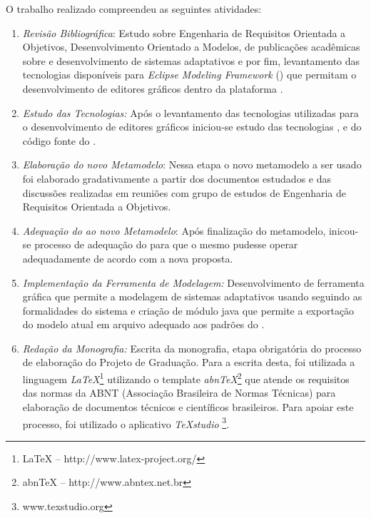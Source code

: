 O trabalho realizado compreendeu as seguintes atividades:


\begin{enumerate}
	
	\item \textit{Revisão Bibliográfica}: Estudo sobre Engenharia de Requisitos Orientada a Objetivos, Desenvolvimento Orientado a Modelos, de publicações acadêmicas sobre \zanshin e desenvolvimento de sistemas adaptativos e por fim, levantamento das tecnologias disponíveis para \textit{Eclipse Modeling Framework} (\emf) que permitam o desenvolvimento de editores gráficos dentro da plataforma \eclipse.
	
	\item \textit{Estudo das Tecnologias:} Após o levantamento das tecnologias utilizadas para o desenvolvimento de editores gráficos iniciou-se estudo das tecnologias \emf, \sirius e do código fonte do \zanshin.
	
	\item \textit{Elaboração do novo Metamodelo}: Nessa etapa o novo metamodelo a ser usado foi elaborado gradativamente a partir dos documentos estudados e das discussões realizadas em reuniões com grupo de estudos de Engenharia de Requisitos Orientada a Objetivos.
	
	\item \textit{Adequação do \zanshin ao novo Metamodelo}: Após finalização do metamodelo, inicou-se processo de adequação do \framework para que o mesmo pudesse operar adequadamente de acordo com a nova proposta.
	
	\item \textit{Implementação da Ferramenta de Modelagem:} Desenvolvimento de ferramenta gráfica que permite a modelagem de sistemas adaptativos usando \gore seguindo as formalidades do sistema \zanshin e criação de módulo java que permite a exportação do modelo atual em arquivo \xml adequado aos padrões do \framework.
	
	\item \textit{Redação da Monografia:} Escrita da monografia, etapa obrigatória do processo de elaboração do Projeto de Graduação. Para a escrita desta, foi utilizada a linguagem \textit{LaTeX}\footnote{LaTeX -- http://www.latex-project.org/} utilizando o template \textit{abnTeX}\footnote{abnTeX -- http://www.abntex.net.br} que atende os requisitos das normas da ABNT (Associação Brasileira de Normas Técnicas) para elaboração de documentos técnicos e científicos brasileiros. Para apoiar este processo, foi utilizado o aplicativo \textit{TeXstudio} \footnote{www.texstudio.org}.
	
\end{enumerate}


